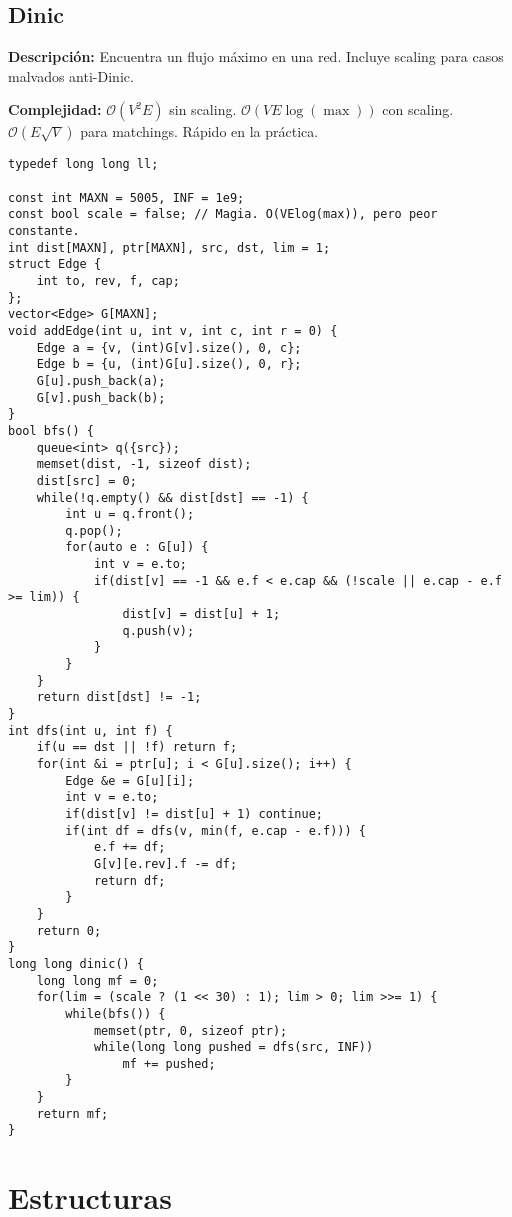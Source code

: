 \documentclass[twocolumn]{article}
\begin{document}
\subsection{Dinic}
\begin{footnotesize}{\bf Descripción:} Encuentra un flujo máximo en una red. Incluye scaling para casos malvados anti-Dinic.


{\bf Complejidad:} $\mathcal{O}(V^2E)$ sin scaling. $\mathcal{O}(VE\log(\max))$ con scaling. $\mathcal{O}(E\sqrt{V})$ para matchings. Rápido en la práctica.
\end{footnotesize}\lstset{basicstyle=\footnotesize\ttfamily,breaklines=true,tabsize=2,language=C++,frame=leftline, numbers=left, numberstyle=\tiny, numbersep=5pt}
\begin{lstlisting}
typedef long long ll;

const int MAXN = 5005, INF = 1e9;
const bool scale = false; // Magia. O(VElog(max)), pero peor constante.
int dist[MAXN], ptr[MAXN], src, dst, lim = 1;
struct Edge {
	int to, rev, f, cap;
};
vector<Edge> G[MAXN];
void addEdge(int u, int v, int c, int r = 0) {
	Edge a = {v, (int)G[v].size(), 0, c};
	Edge b = {u, (int)G[u].size(), 0, r};
	G[u].push_back(a);
	G[v].push_back(b);
}
bool bfs() {
	queue<int> q({src});
	memset(dist, -1, sizeof dist);
	dist[src] = 0;
	while(!q.empty() && dist[dst] == -1) {
		int u = q.front();
		q.pop();
		for(auto e : G[u]) {
			int v = e.to;
			if(dist[v] == -1 && e.f < e.cap && (!scale || e.cap - e.f >= lim)) {
				dist[v] = dist[u] + 1;
				q.push(v);
			}
		}
	}
	return dist[dst] != -1;
}
int dfs(int u, int f) {
	if(u == dst || !f) return f;
	for(int &i = ptr[u]; i < G[u].size(); i++) {
		Edge &e = G[u][i];
		int v = e.to;
		if(dist[v] != dist[u] + 1) continue;
		if(int df = dfs(v, min(f, e.cap - e.f))) {
			e.f += df;
			G[v][e.rev].f -= df;
			return df;
		}
	}
	return 0;
}
long long dinic() {
	long long mf = 0;
	for(lim = (scale ? (1 << 30) : 1); lim > 0; lim >>= 1) {
		while(bfs()) {
			memset(ptr, 0, sizeof ptr);
			while(long long pushed = dfs(src, INF))
				mf += pushed;
		}
	}
	return mf;
}
\end{lstlisting}
\section{Estructuras}
\end{document}
